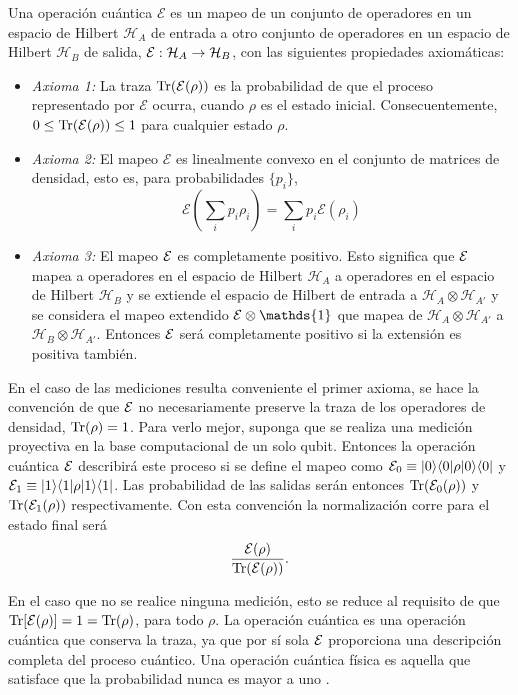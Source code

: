 \begin{definition}\label{DefE(rho)} Una operación cuántica $\mathcal{E}$ es un mapeo de un conjunto de operadores en un espacio de Hilbert $\mathcal{H}_A$ de entrada a otro conjunto de operadores en un espacio de Hilbert $\mathcal{H}_B$ de salida, $\mathcal{E}: \mathcal{H}_A \rightarrow \mathcal{H}_B$, con las siguientes propiedades axiomáticas:

    \begin{itemize}
        \item \textit{Axioma 1:} La traza ${\rm Tr} (\mathcal{E}(\rho))$ es la probabilidad de que el proceso representado por $\mathcal{E}$ ocurra, cuando $\rho$ es el estado inicial. Consecuentemente, $0 \le {\rm Tr} (\mathcal{E}(\rho)) \le 1$ para cualquier estado $\rho$.
        \item \textit{Axioma 2:} El mapeo $\mathcal{E}$ es linealmente convexo en el conjunto de matrices de densidad, esto es, para probabilidades $\{p_i\}$,\[\mathcal{E}\left(\sum _i p_i \rho _i\right)=\sum_i p_i \mathcal{E}(\rho_i)\]
        \item\textit{Axioma 3:} El mapeo $\mathcal{E}$ es completamente positivo. Esto significa que $\mathcal{E}$ mapea a operadores en el espacio de Hilbert $\mathcal{H}_{A}$  a operadores en el espacio de Hilbert $\mathcal{H}_B$ y se extiende el espacio de Hilbert de entrada a $\mathcal{H}_A\otimes\mathcal{H}_{A'}$ y se considera el mapeo extendido $\E \otimes \mathds{1}$ que mapea de $\mathcal{H}_A \otimes \mathcal{H}_{A'} $ a $\mathcal{H}_B \otimes \mathcal{H}_{A'}$. Entonces  $\mathcal{E}$ será completamente positivo si la extensión es positiva también.
    \end{itemize}
\end{definition}

En el caso de las mediciones resulta conveniente el primer axioma, se hace la convención de que $\mathcal{E}$ no necesariamente preserve la traza de los operadores de densidad, ${\rm Tr}(\rho)=1$. Para verlo mejor, suponga que se realiza una medición proyectiva en la base computacional de un solo qubit. Entonces la operación cuántica $\mathcal{E}$ describirá este proceso si se define el mapeo como $\mathcal{E}_0\equiv|0\rangle \langle0|\rho |0\rangle \langle 0|$ y $\mathcal{E}_1\equiv|1\rangle \langle1|\rho |1\rangle \langle 1|$. Las probabilidad de las salidas serán entonces ${\rm Tr} (\mathcal{E}_0(\rho))$ y ${\rm Tr} (\mathcal{E}_1(\rho))$ respectivamente.  Con esta convención la normalización corre para el estado final será \[\dfrac{\mathcal{E}(\rho)}{{\rm Tr} (\mathcal{E} (\rho))}.\]

En el caso que no se realice ninguna medición, esto se reduce al requisito de que ${\rm Tr}[\mathcal{E}(\rho)] = 1 = {\rm Tr}(\rho)$, para todo $\rho$. La operación cuántica es una operación cuántica que conserva la traza, ya que por sí sola $\mathcal{E}$ proporciona una descripción completa del proceso cuántico. Una operación cuántica física es aquella que satisface que la probabilidad nunca es mayor a uno {\cite{nielsen_chuang_2010}}.


